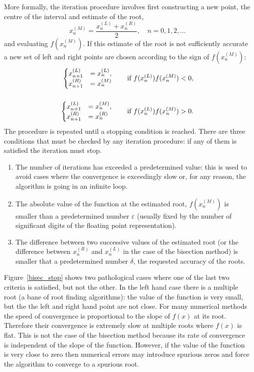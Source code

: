 More formally, the iteration procedure involves first constructing a
new point, the centre of the interval and estimate of the root,
%
\begin{equation*}
  x_n^{(M)} = \frac{x_n^{(L)} + x_n^{(R)}}{2} , \quad
  n = 0,1,2, \ldots
\end{equation*}
%
and evaluating $f(x_n^{(M)})$.    If this estimate of the root is not
sufficiently accurate a new set of left and right points are chosen
according to the sign of $f(x_n^{(M)})$:
%
\begin{align}
  \begin{cases}
    x_{n+1}^{(L)} & = x_n^{(L)}, \\ x_{n+1}^{(R)} & = x_n^{(M)}
  \end{cases}
  \hspace{7mm} \text{if $f(x_n^{(L)}) f(x_n^{(M)}) < 0$} ,
  \label{bisp} \\*[5mm]
  \begin{cases}
    x_{n+1}^{(L)} &= x_n^{(M)}, \\ x_{n+1}^{(R)} & = x_n^{(R)}
  \end{cases}
  \hspace{7mm} \text{if $f(x_n^{(L)}) f(x_n^{(M)}) > 0$} . \label{bisn}
\end{align}
%
The procedure is repeated until a stopping condition is reached.
There are three conditions that must be checked by any iteration
procedure: if any of them is satisfied the iteration must stop.
%
\begin{enumerate}
%
\item The number of iterations has exceeded a predetermined value:
  this is used to avoid cases where the convergence is exceedingly
  slow or, for any reason, the algorithm is going in an infinite loop.
%
\item The absolute value of the function at the estimated root,
  $f(x_n^{(M)})$ is smaller than a predetermined number $\varepsilon$
  (usually fixed by the number of significant digits of the floating
  point representation).
%
\item The difference between two successive values of the estimated
  root (or the difference between $x_n^{(R)}$ and $x_n^{(L)}$ in the
  case of the bisection method) is smaller that a predetermined number
  $\delta$, the requested accuracy of the roots.
%
\end{enumerate}
%
Figure~\ref{bisec_stop} shows two pathological cases where one of the
last two criteria is satisfied, but not the other.  In the left hand
case there is a multiple root (a bane of root finding algorithms): the
value of the function is very small, but the the left and right hand
point are not close.  For many numerical methods the speed of
convergence is proportional to the slope of $f(x)$ at its root.
Therefore their convergence is extremely slow at multiple roots where
$f(x)$ is flat.  This is not the case of the bisection method because
its rate of convergence is independent of the slope of the function.
However, if the value of the function is very close to zero then
numerical errors may introduce spurious zeros and force the algorithm
to converge to a spurious root.

